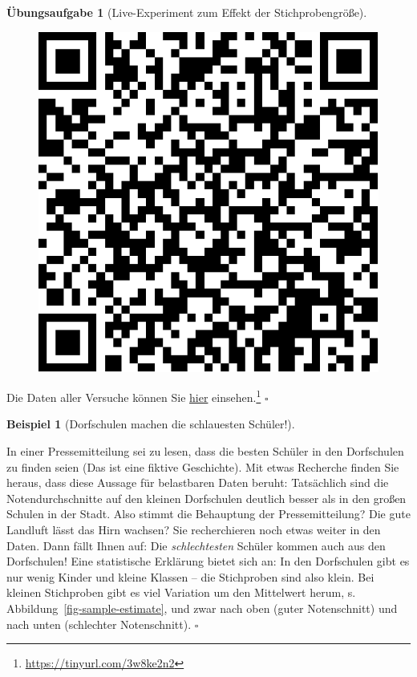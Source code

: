 \documentclass[
  letterpaper,
]{scrbook}
\theoremstyle{definition}
\newtheorem{example}{Beispiel}[chapter]
\theoremstyle{definition}
\theoremstyle{definition}
\newtheorem{exercise}{Übungsaufgabe}[chapter]
\theoremstyle{remark}
\begin{document}
\begin{exercise}[Live-Experiment zum Effekt der
Stichprobengröße]
\begin{figure}
\begin{minipage}{0.20\linewidth}
\begin{center}
\includegraphics[width=0.75\linewidth,height=\textheight,keepaspectratio]{010-rahmen_files/figure-pdf/unnamed-chunk-16-1.pdf}
\end{center}

\end{minipage}%

\end{figure}%

Die Daten aller Versuche können Sie
\href{https://docs.google.com/spreadsheets/d/11mKFFpr-Y1CMPpq4dGA-JA_Z9jRkPbXolo54Y0G_2gE/edit?usp=sharing}{hier}
einsehen.\footnote{\url{https://tinyurl.com/3w8ke2n2}} \(\square\)

\end{exercise}

\begin{example}[Dorfschulen machen die schlauesten
Schüler!]\protect\hypertarget{exm-schule-samplesize}{}\label{exm-schule-samplesize}

In einer Pressemitteilung sei zu lesen, dass die besten Schüler in den
Dorfschulen zu finden seien (Das ist eine fiktive Geschichte). Mit etwas
Recherche finden Sie heraus, dass diese Aussage für belastbaren Daten
beruht: Tatsächlich sind die Notendurchschnitte auf den kleinen
Dorfschulen deutlich besser als in den großen Schulen in der Stadt. Also
stimmt die Behauptung der Pressemitteilung? Die gute Landluft lässt das
Hirn wachsen? Sie recherchieren noch etwas weiter in den Daten. Dann
fällt Ihnen auf: Die \emph{schlechtesten} Schüler kommen auch aus den
Dorfschulen! Eine statistische Erklärung bietet sich an: In den
Dorfschulen gibt es nur wenig Kinder und kleine Klassen -- die
Stichproben sind also klein. Bei kleinen Stichproben gibt es viel
Variation um den Mittelwert herum, s.
Abbildung~\ref{fig-sample-estimate}, und zwar nach oben (guter
Notenschnitt) und nach unten (schlechter Notenschnitt). \(\square\)

\end{example}
\end{document}
